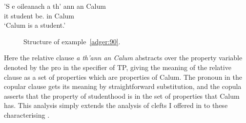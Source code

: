 \documentclass[output=paper]{langsci/langscibook}
\begin{document}
\ea {}\label{adger:90}
\sn \gll  'S e oileanach a th' {ann an} Calum\\
\Cop{} it student \Rel{} be.\Prs{} in Calum\\
\glt \enquote*{Calum is a student.}
\z

\begin{figure}
\caption{Structure of example~\eqref{adger:90}.\label{fig:adger:90}}
\end{figure}

Here the relative clause \emph{a th'ann an Calum} abstracts over the property
variable denoted by the pro in the specifier of TP, giving the meaning of
the relative clause as a set of properties which are properties of Calum. The
pronoun in the copular clause gets its meaning by straightforward substitution,
and the copula asserts that the property of studenthood is in the set of
properties that Calum has. This analysis simply extends the analysis of clefts
I offered in \citep{Adger2011b} to these characterising
.
\end{document}
